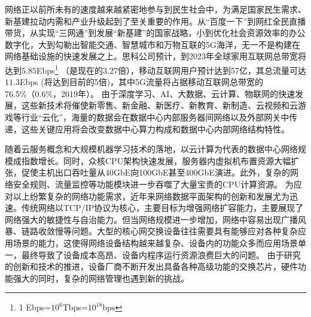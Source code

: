 
\label{chap1}


\label{chap11}
\label{chap111}


网络正以前所未有的速度越来越紧密地参与到民生社会中，为满足国家民生需求、新基建拉动内需和产业升级起到了至关重要的作用。从“百度一下”到网红全民直播带货，从实现“三网通”到发展“新基建”的国家战略，小到优化社会资源效率的办公数字化，大到勾勒出智能交通、智慧城市和万物互联的5G海洋，无一不是构建在网络基础设施的快速发展之上。思科公司预计，到2023年全球家用互联网总带宽将达到$5.85$Ebps\footnote{1 Ebps=$10^6$Tbps=$10^{18}$bps} （是现在的3.27倍），移动互联网用户预计达到57亿，其总流量可达$11.3$Ebps (将达到目前的5倍)，其中5G流量将占据移动互联网总带宽的76.5\%（0.6\%，2019年）。
由于深度学习、AI、大数据、云计算、物联网的快速发展，这些新技术将催使新零售、新金融、新医疗、新教育、新制造、云视频和云游戏等行业“云化”，海量的数据会在数据中心内部服务器间网络以及外部网关中传递，这些关键应用将会改变数据中心算力构成和数据中心内部网络结构特性。

随着云服务概念和大规模机器学习技术的落地，以云计算为代表的数据中心网络规模成指数增长。同时，众核CPU架构快速发展，服务器内虚拟机布置资源大幅扩张，促使主机出口吞吐量从40GbE向100GbE甚至400GbE演进。此外，复杂的网络安全规则、流量监控等功能模块进一步吞噬了大量宝贵的CPU计算资源。
为应对以上纷繁复杂的网络功能需求，近年来网络数据平面架构的创新和发展尤为迅速。传统网络以TCP/IP协议为核心，主要目标为增强网络扩容能力，主要展现了网络强大的敏捷性与自治能力。但当网络规模进一步增加，网络中容易出现广播风暴、链路收敛慢等问题。大型的核心网交换设备往往需要具有能够应对各种复杂应用场景的能力，这使得网络设备结构越来越复杂、设备内的功能众多而应用场景单一，最终导致了设备成本高昂、设备内程序运行资源浪费巨大的问题。
由于研究的创新和技术的推进，设备厂商不断开发出具备各种高级功能的交换芯片，硬件功能强大的同时，复杂的网络管理也遇到新的挑战。

